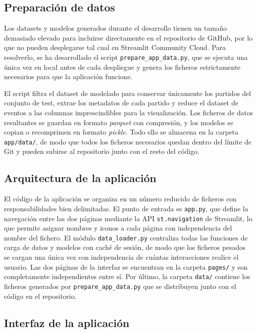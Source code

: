 \subsection{Preparación de datos}

Los datasets y modelos generados durante el desarrollo tienen un tamaño demasiado elevado para incluirse directamente en el repositorio de GitHub, por lo que no pueden desplegarse tal cual en Streamlit Community Cloud. Para resolverlo, se ha desarrollado el script \texttt{prepare\_app\_data.py}, que se ejecuta una única vez en local antes de cada despliegue y genera los ficheros estrictamente necesarios para que la aplicación funcione.

El script filtra el dataset de modelado para conservar únicamente los partidos del conjunto de test, extrae los metadatos de cada partido y reduce el dataset de eventos a las columnas imprescindibles para la visualización. Los ficheros de datos resultantes se guardan en formato \textit{parquet} con compresión, y los modelos se copian o recomprimen en formato \textit{pickle}. Todo ello se almacena en la carpeta \texttt{app/data/}, de modo que todos los ficheros necesarios quedan dentro del límite de Git y pueden subirse al repositorio junto con el resto del código.

\subsection{Arquitectura de la aplicación}

El código de la aplicación se organiza en un número reducido de ficheros con responsabilidades bien delimitadas. El punto de entrada es \texttt{app.py}, que define la navegación entre las dos páginas mediante la API \texttt{st.navigation} de Streamlit, lo que permite asignar nombres y iconos a cada página con independencia del nombre del fichero. El módulo \texttt{data\_loader.py} centraliza todas las funciones de carga de datos y modelos con caché de sesión, de modo que los ficheros pesados se cargan una única vez con independencia de cuántas interacciones realice el usuario. Las dos páginas de la interfaz se encuentran en la carpeta \texttt{pages/} y son completamente independientes entre sí. Por último, la carpeta \texttt{data/} contiene los ficheros generados por \texttt{prepare\_app\_data.py} que se distribuyen junto con el código en el repositorio.

\subsection{Interfaz de la aplicación}

